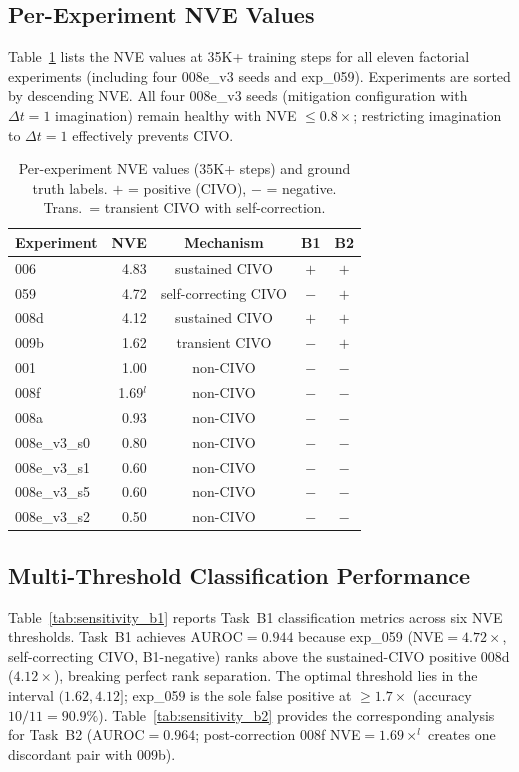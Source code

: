 \subsection{Per-Experiment NVE Values}

Table~\ref{tab:nve_raw} lists the NVE values at 35K+ training steps for all eleven factorial experiments (including four 008e\_v3 seeds and exp\_059). Experiments are sorted by descending NVE. All four 008e\_v3 seeds (mitigation configuration with $\Delta t{=}1$ imagination) remain healthy with NVE $\leq 0.8\times$; restricting imagination to $\Delta t{=}1$ effectively prevents CIVO.

\begin{table}[ht]
\centering
\caption{Per-experiment NVE values (35K+ steps) and ground truth labels. $+$ = positive (CIVO), $-$ = negative. Trans.\ = transient CIVO with self-correction.}
\label{tab:nve_raw}
\small
\begin{tabular}{@{}lrccc@{}}
\toprule
Experiment & NVE & Mechanism & B1 & B2 \\
\midrule
006          & 4.83 & sustained CIVO & $+$ & $+$ \\
059          & 4.72 & self-correcting CIVO & $-$ & $+$ \\
008d         & 4.12 & sustained CIVO & $+$ & $+$ \\
009b         & 1.62 & transient CIVO & $-$ & $+$ \\
001          & 1.00 & non-CIVO       & $-$ & $-$ \\
008f         & 1.69$^l$ & non-CIVO       & $-$ & $-$ \\
008a         & 0.93 & non-CIVO       & $-$ & $-$ \\
008e\_v3\_s0 & 0.80 & non-CIVO       & $-$ & $-$ \\
008e\_v3\_s1 & 0.60 & non-CIVO       & $-$ & $-$ \\
008e\_v3\_s5 & 0.60 & non-CIVO       & $-$ & $-$ \\
008e\_v3\_s2 & 0.50 & non-CIVO       & $-$ & $-$ \\
\bottomrule
\end{tabular}
\end{table}

\subsection{Multi-Threshold Classification Performance}

Table~\ref{tab:sensitivity_b1} reports Task~B1 classification metrics across six NVE thresholds. Task~B1 achieves $\text{AUROC} = 0.944$ because exp\_059 (NVE${=}4.72\times$, self-correcting CIVO, B1-negative) ranks above the sustained-CIVO positive 008d ($4.12\times$), breaking perfect rank separation. The optimal threshold lies in the interval $(1.62, 4.12]$; exp\_059 is the sole false positive at $\geq 1.7\times$ (accuracy $10/11 = 90.9\%$). Table~\ref{tab:sensitivity_b2} provides the corresponding analysis for Task~B2 ($\text{AUROC} = 0.964$; post-correction 008f NVE${=}1.69\times^l$ creates one discordant pair with 009b).

